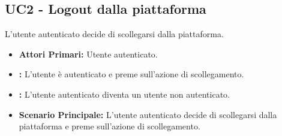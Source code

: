 \subsection{UC2 - Logout dalla piattaforma}\label{UC2}
L'utente autenticato decide di scollegarsi dalla piattaforma.
\begin{itemize}
    \item \textbf{Attori Primari:} Utente autenticato.
    \item \textbf{:} L'utente è autenticato e preme sull'azione di scollegamento.
    \item \textbf{:} L'utente autenticato diventa un utente non autenticato.
    \item \textbf{Scenario Principale:} L'utente autenticato decide di scollegarsi dalla piattaforma e preme sull'azione di scollegamento.
\end{itemize}
